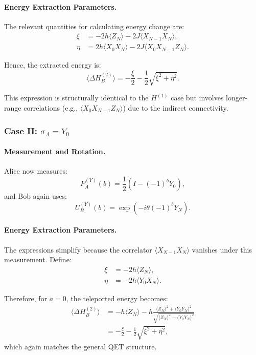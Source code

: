 \paragraph{Energy Extraction Parameters.}
The relevant quantities for calculating energy change are:
\begin{align}
\xi &= -2h \langle Z_N \rangle - 2J \langle X_{N-1} X_N \rangle, \\
\eta &= 2h \langle X_0 X_N \rangle - 2J \langle X_0 X_{N-1} Z_N \rangle.
\end{align}

Hence, the extracted energy is:
\begin{equation}
\langle \Delta H_B^{(2)} \rangle = -\frac{\xi}{2} - \frac{1}{2} \sqrt{\xi^2 + \eta^2}.
\end{equation}

This expression is structurally identical to the \( H^{(1)} \) case but involves longer-range correlations (e.g., \( \langle X_0 X_{N-1} Z_N \rangle \)) due to the indirect connectivity.

\subsubsection{Case II: \texorpdfstring{$\sigma_A = Y_0$}{sigmaAY0}}

\paragraph{Measurement and Rotation.}
Alice now measures:
\begin{equation}
P_A^{(Y)}(b) = \frac{1}{2} \left( I - (-1)^b Y_0 \right),
\end{equation}
and Bob again uses:
\begin{equation}
U_B^{(Y)}(b) = \exp(-i \theta (-1)^b Y_N).
\end{equation}

\paragraph{Energy Extraction Parameters.}
The expressions simplify because the correlator \( \langle X_{N-1} X_N \rangle \) vanishes under this measurement. Define:
\begin{align}
\xi &= -2h \langle Z_N \rangle, \\
\eta &= -2h \langle Y_0 X_N \rangle.
\end{align}

Therefore, for \( a = 0 \), the teleported energy becomes:
\begin{align}
\langle \Delta H_B^{(2)} \rangle &= -h\langle Z_N \rangle - h\frac{\langle Z_N \rangle^2 + \langle Y_0Y_N \rangle^2}{\sqrt{\langle Z_N \rangle^2 + \langle Y_0Y_N \rangle^2}} \nonumber \\
&= -\frac{\xi}{2} - \frac{1}{2} \sqrt{\xi^2 + \eta^2},
\end{align}
which again matches the general QET structure.

